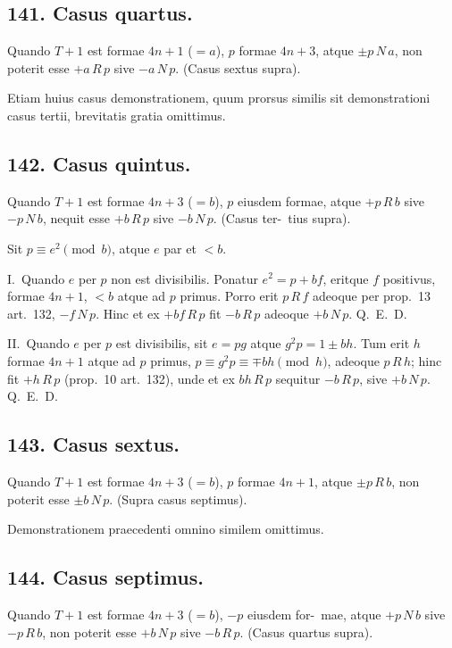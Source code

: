 \documentclass[12pt,a4paper]{article}
\theoremstyle{plain}
\theoremstyle{definition}
\theoremstyle{remark}
\begin{document}
\subsection*{141. Casus quartus.}

Quando $T+1$ est formae $4n+1$ ($= a$), $p$ formae $4n+3$,
atque $\pm p \, N \, a$, non poterit esse $+a \, R \, p$ sive $-a \, N \, p$. (Casus sextus supra).

Etiam huius casus demonstrationem, quum prorsus similis sit demonstrationi
casus tertii, brevitatis gratia omittimus.

\subsection*{142. Casus quintus.}

Quando $T+1$ est formae $4n+3$ ($= b$), $p$ eiusdem formae,
atque $+p \, R \, b$ sive $-p \, N \, b$, nequit esse $+b \, R \, p$ sive $-b \, N \, p$. (Casus ter-\ tius supra).

Sit $p \equiv e^2 \pmod{b}$, atque $e$ par et $< b$.

I.\ Quando $e$ per $p$ non est divisibilis. Ponatur $e^2 = p + bf$, eritque $f$
positivus, formae $4n+1$, $< b$ atque ad $p$ primus. Porro erit $p \, R \, f$ adeoque
per prop.~13 art.~132, $-f \, N \, p$. Hinc et ex $+bf \, R \, p$ fit $-b \, R \, p$ adeoque
$+b \, N \, p$. Q.~E.~D.

II.\ Quando $e$ per $p$ est divisibilis, sit $e = pg$ atque $g^2p = 1 \pm bh$.
Tum erit $h$ formae $4n+1$ atque ad $p$ primus, $p \equiv g^2p \equiv \mp bh \pmod{h}$, adeoque
$p \, R \, h$; hinc fit $+h \, R \, p$ (prop.~10 art.~132), unde et ex $bh \, R \, p$ sequitur $-b \, R \, p$,
sive $+b \, N \, p$. Q.~E.~D.

\subsection*{143. Casus sextus.}

Quando $T+1$ est formae $4n+3$ ($= b$), $p$ formae $4n+1$,
atque $\pm p \, R \, b$, non poterit esse $\pm b \, N \, p$. (Supra casus septimus).

Demonstrationem praecedenti omnino similem omittimus.

\subsection*{144. Casus septimus.}

Quando $T+1$ est formae $4n+3$ ($= b$), $-p$ eiusdem for-\ mae, atque $+p \, N \, b$ sive $-p \, R \, b$, non poterit esse $+b \, N \, p$ sive $-b \, R \, p$. (Casus
quartus supra).
\end{document}
